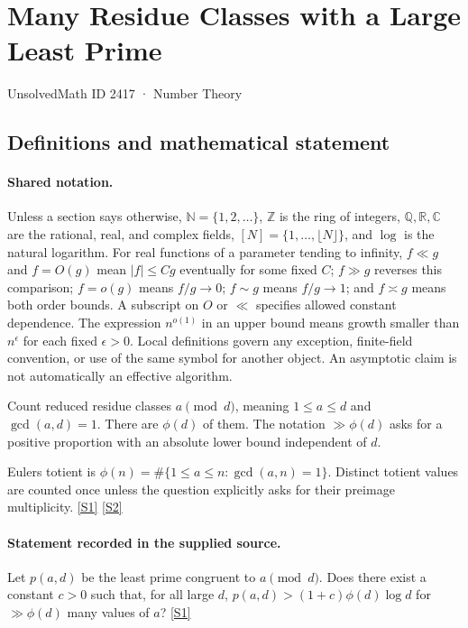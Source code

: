 \documentclass[11pt,a4paper]{article}
\newcommand{\N}{\mathbb{N}}
\newcommand{\Z}{\mathbb{Z}}
\newcommand{\Q}{\mathbb{Q}}
\newcommand{\R}{\mathbb{R}}
\newcommand{\C}{\mathbb{C}}
\newcommand{\sref}[2]{\hyperlink{source:#1:#2}{[S#2]}}
\begin{document}

\setcounter{section}{2416}

\section{Many Residue Classes with a Large Least Prime}\label{2417}

{\small\sffamily UnsolvedMath ID 2417 · Number Theory}

\subsection{Definitions and mathematical statement}

\paragraph{Shared notation.}Unless a section says otherwise, $\N=\{1,2,\ldots\}$,
$\Z$ is the ring of integers, $\Q,\R,\C$ are the rational, real, and complex
fields, $[N]=\{1,\ldots,\lfloor N\rfloor\}$, and $\log$ is the natural
logarithm. For real functions of a parameter tending to infinity,
$f\ll g$ and $f=O(g)$ mean $|f|\leq Cg$ eventually for some fixed $C$;
$f\gg g$ reverses this comparison; $f=o(g)$ means $f/g\to0$;
$f\sim g$ means $f/g\to1$; and $f\asymp g$ means both order bounds.
A subscript on $O$ or $\ll$ specifies allowed constant dependence.
The expression $n^{o(1)}$ in an upper bound means growth smaller than
$n^\epsilon$ for each fixed $\epsilon>0$. Local definitions govern any
exception, finite-field convention, or use of the same symbol for another
object. An asymptotic claim is not automatically an effective algorithm.



Count reduced residue classes $a\pmod d$, meaning $1\leq a\leq d$ and $\gcd(a,d)=1$. There are $\phi(d)$ of them. The notation $\gg\phi(d)$ asks for a positive proportion with an absolute lower bound independent of $d$.

Euler\textquotesingle s totient is $\phi(n)=\#\{1\leq a\leq n:\gcd(a,n)=1\}$. Distinct totient values are counted once unless the question explicitly asks for their preimage multiplicity. \sref{2417}{1} \sref{2417}{2}

\paragraph{Statement recorded in the supplied source.}
Let $p(a,d)$ be the least prime congruent to $a\pmod{d}$. Does there exist a constant $c>0$ such that, for all large $d$, $ p(a,d) > (1+c)\phi(d)\log d $ for $\gg \phi(d)$ many values of $a$? \sref{2417}{1}
\end{document}
